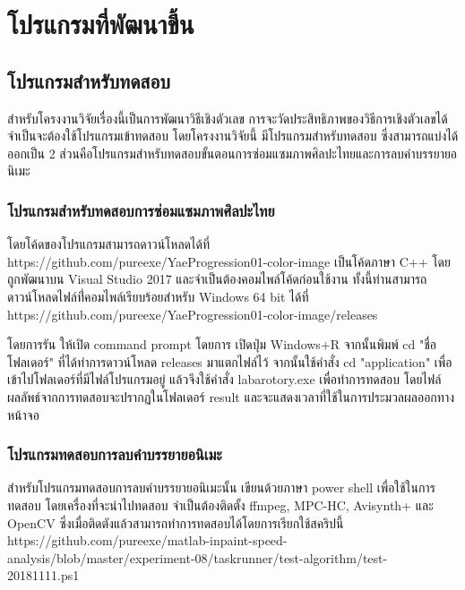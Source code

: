 \chapter{โปรแกรมที่พัฒนาขึ้น}
\section{โปรแกรมสำหรับทดสอบ}
\hspace{1cm} สำหรับโครงงานวิจัยเรื่องนี้เป็นการพัฒนาวิธีเชิงตัวเลข การจะวัดประสิทธิภาพของวิธีการเชิงตัวเลขได้ จำเป็นจะต้องใช้โปรแกรมเข้าทดสอบ โดยโครงงานวิจัยนี้ มีโปรแกรมสำหรับทดสอบ ซึ่งสามารถแบ่งได้ออกเป็น 2 ส่วนคือโปรแกรมสำหรับทดสอบขั้นตอนการซ่อมแซมภาพศิลปะไทยและการลบคำบรรยายอนิเมะ
\subsection{โปรแกรมสำหรับทดสอบการซ่อมแซมภาพศิลปะไทย}
\hspace{1cm} โดยโค้ดของโปรแกรมสามารถดาวน์โหลดได้ที่ https://github.com/pureexe/YaeProgression01-color-image เป็นโค้ดภาษา C++ โดยถูกพัฒนาบน Visual Studio 2017 และจำเป็นต้องคอมไพล์โค้ดก่อนใช้งาน ทั้งนี้ท่านสามารถดาวน์โหลดไฟล์ที่่คอมไพล์เรียบร้อยสำหรับ Windows 64 bit ได้ที่ https://github.com/pureexe/YaeProgression01-color-image/releases

\hspace{1cm} โดยการรัน ให้เปิด command prompt โดยการ เปิดปุ่ม Windows+R จากนั้นพิมพ์ cd "ชื่อโฟลเดอร์" ที่ได้ทำการดาวน์โหลด releases มาแตกไฟล์ไว้ จากนั้นใช้คำสั่ง cd "application" เพื่อเข้าไปโฟลเดอร์ที่มีไฟล์โปรแกรมอยู่ แล้วจึงใช้คำสั่ง labarotory.exe เพื่อทำการทดสอบ โดยไฟล์ผลลัพธ์จากการทดสอบจะปรากฏในโฟลเดอร์ result และจะแสดงเวลาที่ใช้ในการประมวลผลออกทางหน้าจอ



\subsection{โปรแกรมทดสอบการลบคำบรรยายอนิเมะ}
\hspace{1cm} สำหรับโปรแกรมทดสอบการลบคำบรรยายอนิเมะนั้น เขียนด้วยภาษา power shell เพื่อใช้ในการทดสอบ โดยเครื่องที่จะนำไปทดสอบ จำเป็นต้องติดตั้ง ffmpeg, MPC-HC, Avisynth+ และ OpenCV ซึ่งเมื่อติดตังแล้วสามารถทำการทดสอบได้โดยการเรียกใช้สคริปนี้ https://github.com/pureexe/matlab-inpaint-speed-analysis/blob/master/experiment-08/taskrunner/test-algorithm/test-20181111.ps1




